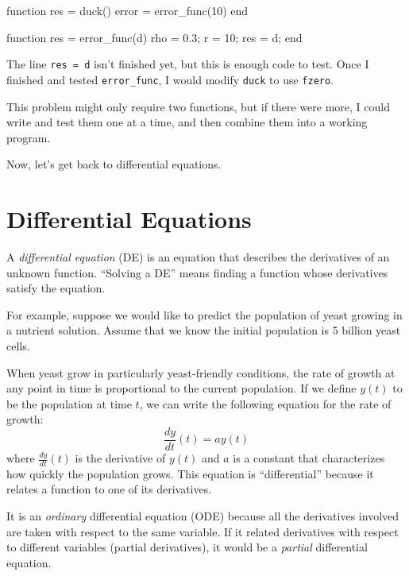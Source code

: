 \begin{code}
function res = duck()
    error = error_func(10)
end

function res = error_func(d)
    rho = 0.3;      %
    r = 10;         %
    res = d;
end
\end{code}

The line {\tt res = d} isn't finished yet, but this
is enough code to test.
Once I finished and tested \verb"error_func", I would modify
{\tt duck} to use {\tt fzero}.

This problem might only require two functions, but if there
were more, I could write and test them one at a time, and then
combine them into a working program.

Now, let's get back to differential equations.


\section{Differential Equations}
\label{diffeq}

A {\em differential equation} (DE) is an equation that describes the
derivatives of an unknown function.  ``Solving a DE'' means finding a
function whose derivatives satisfy the equation.


For example, suppose we would like to predict the population of yeast growing in a nutrient solution.  Assume that we know the initial population is 5 billion yeast cells.

When yeast grow in particularly yeast-friendly
conditions, the rate of growth at any point in time is proportional to
the current population.
If we define $y(t)$ to be the population at 
time $t$, we can write the following equation for the rate of growth:
%
\begin{equation}
\frac{dy}{dt}(t) = a y(t)
\end{equation}
%
where $\frac{dy}{dt}(t)$ is the derivative of $y(t)$ and
$a$ is a constant that characterizes how quickly the population
grows.
This equation is ``differential'' because it relates a function to one of its derivatives.


It is an {\em ordinary} differential equation (ODE) because all the
derivatives involved are taken with respect to the
same variable.
If it related derivatives with respect to
different variables (partial derivatives), it would be a {\em partial}
differential equation.

